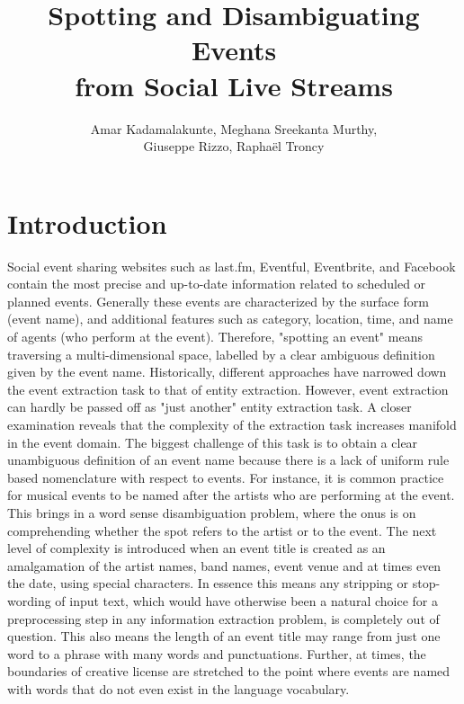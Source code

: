 \documentclass[10pt,a4paper]{article}
\author{Amar Kadamalakunte, Meghana Sreekanta Murthy,\\Giuseppe Rizzo, Rapha\"el Troncy}
\title{Spotting and Disambiguating Events\\from Social Live Streams}
\begin{document}
\maketitle
\section{Introduction}
\label{sec:introduction}
Social event sharing websites such as last.fm, Eventful, Eventbrite, and Facebook contain the most precise and up-to-date information related to scheduled or planned events. 
Generally these events are characterized by the surface form (event name), and additional features such as category, location, time, and name of agents (who perform at the event). Therefore, "spotting an event" means traversing a multi-dimensional space, labelled by a clear ambiguous definition given by the event name. 
Historically, different approaches have narrowed down the event extraction task to that of entity extraction. However, event extraction can hardly be passed off as "just another" entity extraction task. A closer examination reveals that the complexity of the extraction task increases manifold in the event domain. The biggest challenge of this task is to obtain a clear unambiguous definition of an event name because there is a lack of uniform rule based nomenclature with respect to events. 
For instance, it is common practice for musical events to be named after the artists who are performing at the event. 
This brings in a word sense disambiguation problem, where the onus is on comprehending whether the spot refers to the artist or to the event. The next level of complexity is introduced when an event title is created as an amalgamation of the artist names, band names, event venue and at times even the date, using special characters. %
In essence this means any stripping or stop-wording of input text, which would have otherwise been a natural choice for a preprocessing step in any information extraction problem, is completely out of question. This also means the length of an event title may range from just one word to a phrase with many words and punctuations. Further, at times, the boundaries of creative license are stretched to the point where events are named with words that do not even exist in the language vocabulary. 
\end{document}
